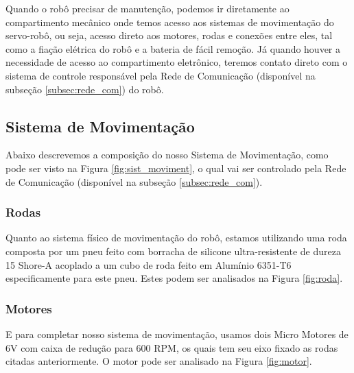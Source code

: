 Quando o robô precisar de manutenção, podemos ir diretamente ao compartimento mecânico onde temos acesso aos sistemas de movimentação do servo-robô, ou seja, acesso direto aos motores, rodas e conexões entre eles, tal como a fiação elétrica do robô e a bateria de fácil remoção.
Já quando houver a necessidade de acesso ao compartimento eletrônico, teremos contato direto com o sistema de controle responsável pela Rede de Comunicação (disponível na subseção \ref{subsec:rede_com}) do robô. 

\subsection{Sistema de Movimentação}\label{subsec:sist_mov}

Abaixo descrevemos a composição do nosso Sistema de Movimentação, como pode ser visto na Figura \ref{fig:sist_moviment}, o qual vai ser controlado pela Rede de Comunicação (disponível na subseção \ref{subsec:rede_com}).

\subsubsection{Rodas}
Quanto ao sistema físico de movimentação do robô, estamos utilizando uma roda composta por um pneu feito com borracha de silicone ultra-resistente de dureza 15 Shore-A acoplado a um cubo de roda feito em Alumínio 6351-T6 especificamente para este pneu. Estes podem ser analisados na Figura \ref{fig:roda}.

\subsubsection{Motores}
E para completar nosso sistema de movimentação, usamos dois Micro Motores de 6V com caixa de redução para 600 RPM, os quais tem seu eixo fixado as rodas citadas anteriormente. O motor pode ser analisado na Figura \ref{fig:motor}.

